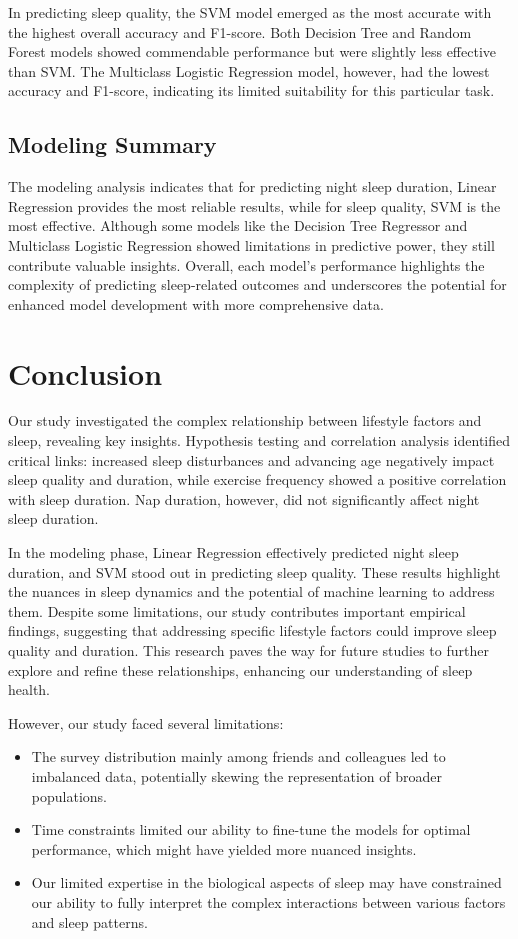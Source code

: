 \documentclass[conference]{IEEEtran}
\begin{document}
In predicting sleep quality, the SVM model emerged as the most accurate with the highest overall accuracy and F1-score. Both Decision Tree and Random Forest models showed commendable performance but were slightly less effective than SVM. The Multiclass Logistic Regression model, however, had the lowest accuracy and F1-score, indicating its limited suitability for this particular task.

\subsection*{Modeling Summary}
The modeling analysis indicates that for predicting night sleep duration, Linear Regression provides the most reliable results, while for sleep quality, SVM is the most effective. Although some models like the Decision Tree Regressor and Multiclass Logistic Regression showed limitations in predictive power, they still contribute valuable insights. Overall, each model's performance highlights the complexity of predicting sleep-related outcomes and underscores the potential for enhanced model development with more comprehensive data.

\section{Conclusion}

Our study investigated the complex relationship between lifestyle factors and sleep, revealing key insights. Hypothesis testing and correlation analysis identified critical links: increased sleep disturbances and advancing age negatively impact sleep quality and duration, while exercise frequency showed a positive correlation with sleep duration. Nap duration, however, did not significantly affect night sleep duration.

In the modeling phase, Linear Regression effectively predicted night sleep duration, and SVM stood out in predicting sleep quality. These results highlight the nuances in sleep dynamics and the potential of machine learning to address them. Despite some limitations, our study contributes important empirical findings, suggesting that addressing specific lifestyle factors could improve sleep quality and duration. This research paves the way for future studies to further explore and refine these relationships, enhancing our understanding of sleep health.


However, our study faced several limitations:
\begin{itemize}
    \item The survey distribution mainly among friends and colleagues led to imbalanced data, potentially skewing the representation of broader populations.
    \item Time constraints limited our ability to fine-tune the models for optimal performance, which might have yielded more nuanced insights.
    \item Our limited expertise in the biological aspects of sleep may have constrained our ability to fully interpret the complex interactions between various factors and sleep patterns.
\end{itemize}
\end{document}
